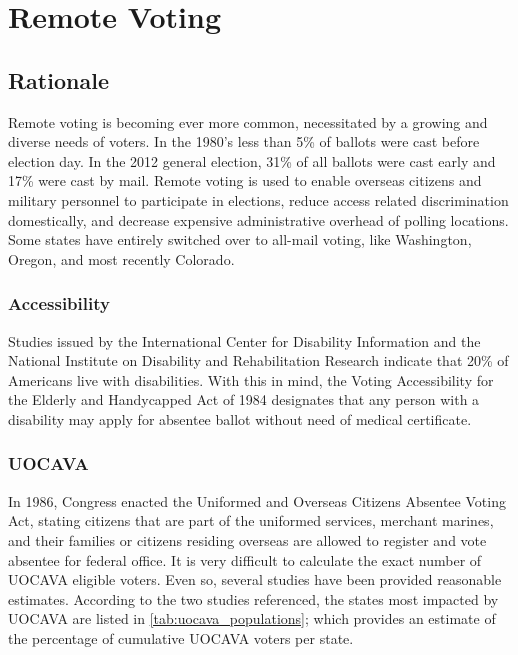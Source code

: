 \chapter{Remote Voting}
\label{chapter:remote_voting}

\section{Rationale}
Remote voting is becoming ever more common, necessitated by a growing and
diverse needs of voters. In the 1980's less than 5\% of ballots were cast
before election day. In the 2012 general election, 31\% of all ballots were
cast early and 17\% were cast by mail. Remote voting is used to enable
overseas citizens and military personnel to participate in elections,
reduce access related discrimination domestically, and decrease expensive
administrative overhead of polling locations. Some states have entirely
switched over to all-mail voting, like Washington, Oregon, and most
recently Colorado.

\subsection{Accessibility}
Studies issued by the International Center for Disability Information and the
National Institute on Disability and Rehabilitation Research indicate that 20\%
of Americans live with disabilities. With this in mind, the Voting
Accessibility for the Elderly and Handycapped Act of 1984 designates that any
person with a disability may apply for absentee ballot without need of medical
certificate.


\subsection{UOCAVA}
In 1986, Congress enacted the Uniformed and Overseas Citizens Absentee Voting
Act, stating citizens that are part of the uniformed services, merchant
marines, and their families or citizens residing overseas are allowed to
register and vote absentee for federal office. It is very difficult to
calculate the exact number of UOCAVA eligible voters. Even so, several
studies have been provided reasonable estimates. According to the two studies
referenced, the states most impacted by UOCAVA are listed in
\autoref{tab:uocava_populations}; which provides an estimate of the percentage
of cumulative UOCAVA voters per state.

